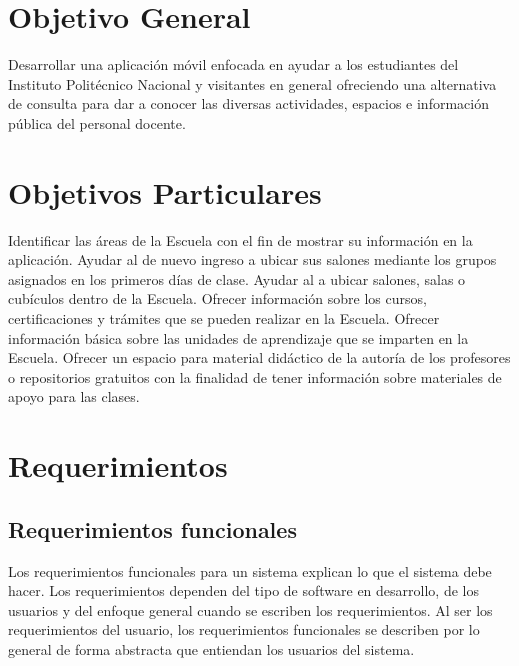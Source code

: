 \section{Objetivo General}

	Desarrollar una aplicación móvil enfocada en ayudar a los estudiantes del Instituto Politécnico Nacional y visitantes en general ofreciendo una alternativa de consulta para dar a conocer las diversas actividades, espacios e información pública del personal docente.
	
	\section{Objetivos Particulares}	
	
	
	
	\begin{UClist}
		\UCli Identificar las áreas de la Escuela con el fin de mostrar su información en la aplicación.
		\UCli Ayudar al  de nuevo ingreso a ubicar sus salones mediante los grupos asignados en los primeros días de clase.
		\UCli Ayudar al  a ubicar salones, salas o cubículos dentro de la Escuela.
		\UCli Ofrecer información sobre los cursos, certificaciones y trámites que se pueden realizar en la Escuela.
		\UCli Ofrecer información básica sobre las unidades de aprendizaje que se imparten en la Escuela.
		\UCli Ofrecer un espacio para material didáctico de la autoría de los profesores o repositorios gratuitos con la finalidad de tener información sobre materiales de apoyo para las clases.
	\end{UClist}
	
	\section{Requerimientos}
	\subsection{Requerimientos funcionales}
	
	Los requerimientos funcionales para un sistema explican lo que el sistema debe hacer. Los requerimientos dependen del tipo de software en desarrollo, de los usuarios y del enfoque general cuando se escriben los requerimientos. Al ser los requerimientos del usuario, los requerimientos funcionales se describen por lo general de forma abstracta que entiendan los usuarios del sistema.
	
